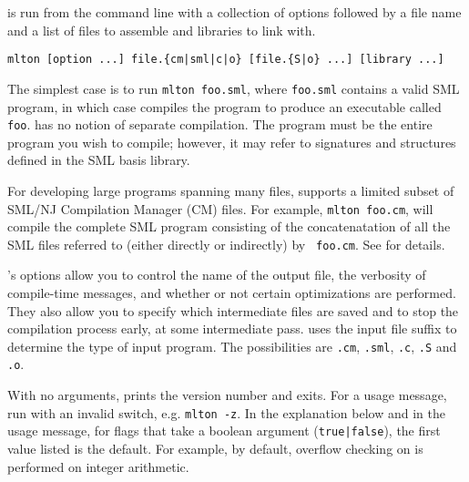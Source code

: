 
{\mlton} is run from the command line with a collection of options followed by a
file name and a list of files to assemble and libraries to link with.
\begin{verbatim}
mlton [option ...] file.{cm|sml|c|o} [file.{S|o} ...] [library ...]
\end{verbatim}
The simplest case is to run {\tt mlton foo.sml}, where {\tt foo.sml} contains a
valid SML program, in which case {\mlton} compiles the program to produce an
executable called {\tt foo}.  {\mlton} has no notion of separate compilation.
The program must be the entire program you wish to compile; however, it may
refer to signatures and structures defined in the SML basis library.

For developing large programs spanning many files, {\mlton} supports a limited
subset of SML/NJ Compilation Manager (CM) files.  For example, {\tt mlton
foo.cm}, will compile the complete SML program consisting of the concatenatation
of all the SML files referred to (either directly or indirectly) by {\tt
foo.cm}.  See  for details.


{\mlton}'s options allow you to control the name of the output file, the
verbosity of compile-time messages, and whether or not certain optimizations are
performed.  They also allow you to specify which intermediate files are saved
and to stop the compilation process early, at some intermediate pass.  {\mlton}
uses the input file suffix to determine the type of input program.  The
possibilities are {\tt .cm}, {\tt .sml}, {\tt .c}, {\tt .S} and {\tt .o}.

With no arguments, {\mlton} prints the version number and exits.  For
a usage message, run {\mlton} with an invalid switch, e.g. {\tt mlton
-z}.  In the explanation below and in the usage message, for flags
that take a boolean argument ({\tt {true|false}}), the first value
listed is the default.  For example, by default, overflow checking on
is performed on integer arithmetic.

\newcommand{\option}[1]{\item[{\tt #1}]\hspace{1em}\\}

